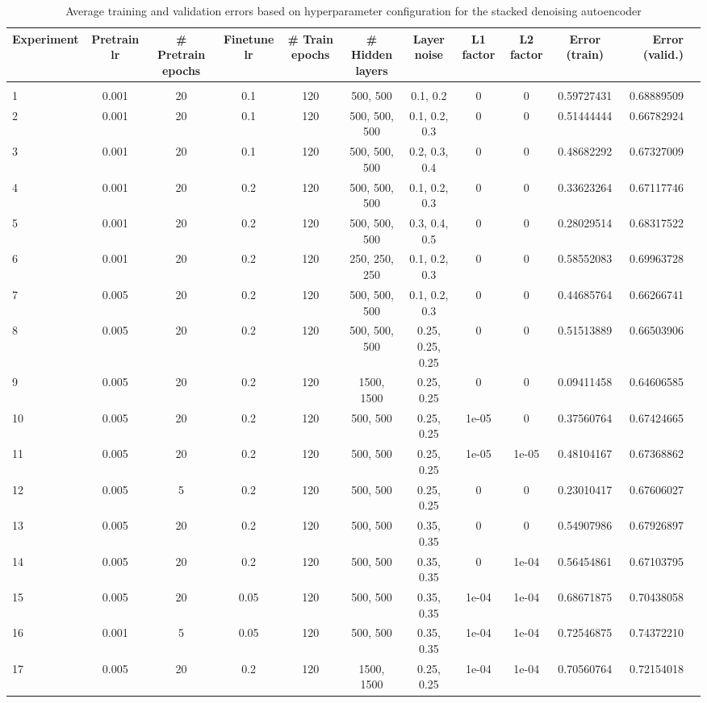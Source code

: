 \documentclass{acm_proc_article-sp}
\begin{document}
\appendix
\label{appendix}
\begin{table}
\caption{Average training and validation errors based on hyperparameter configuration for the stacked denoising autoencoder}
\label{tab:sda_params}
\begin{center}
\begin{adjustbox}{width=\textwidth}
\begin{tabular}{lccccccccc|rr|}

{\bf Experiment} & {\bf Pretrain lr} & {\bf \# Pretrain epochs}
&{\bf Finetune lr}
&{\bf \# Train epochs}
&{\bf \# Hidden layers}
&{\bf Layer noise}
&{\bf L1 factor}
&{\bf L2 factor}
&{\bf Error (train)}
&{\bf Error (valid.)}
\\ \hline \\	
1 & 0.001 & 20 & 0.1 & 120 & 500, 500 & 0.1, 0.2 & 0 & 0 & 0.59727431 & 0.68889509 \\
2 & 0.001 & 20 & 0.1 & 120 & 500, 500, 500 & 0.1, 0.2, 0.3 & 0 & 0 & 0.51444444 & 0.66782924 \\
3 & 0.001 & 20 & 0.1 & 120 & 500, 500, 500 & 0.2, 0.3, 0.4 & 0 & 0 & 0.48682292 & 0.67327009 \\
4& 0.001 & 20 & 0.2 & 120 & 500, 500, 500 & 0.1, 0.2, 0.3 & 0 & 0 & 0.33623264 & 0.67117746 \\
5 & 0.001 & 20 & 0.2 & 120 & 500, 500, 500 & 0.3, 0.4, 0.5 & 0 & 0 & 0.28029514 & 0.68317522 \\
6 & 0.001 & 20 & 0.2 & 120 & 250, 250, 250 & 0.1, 0.2, 0.3 & 0 & 0 & 0.58552083 & 0.69963728 \\
7 & 0.005 & 20 & 0.2 & 120 & 500, 500, 500 & 0.1, 0.2, 0.3 & 0 & 0 & 0.44685764 & 0.66266741 \\
8 & 0.005 & 20 & 0.2 & 120 & 500, 500, 500 & 0.25, 0.25, 0.25 & 0 & 0 & 0.51513889 & 0.66503906 \\
9 & 0.005 & 20 & 0.2 & 120 & 1500, 1500 & 0.25, 0.25 & 0 & 0 & 0.09411458 & 0.64606585 \\
10 & 0.005 & 20 & 0.2 & 120 & 500, 500 & 0.25, 0.25 & 1e-05 & 0 & 0.37560764 & 0.67424665 \\
11 & 0.005 & 20 & 0.2 & 120 & 500, 500 & 0.25, 0.25 & 1e-05 & 1e-05 & 0.48104167 & 0.67368862 \\
12 & 0.005 & 5 & 0.2 & 120 & 500, 500 & 0.25, 0.25 & 0 & 0 & 0.23010417 & 0.67606027 \\
13 & 0.005 & 20 & 0.2 & 120 & 500, 500 & 0.35, 0.35 & 0 & 0 & 0.54907986 & 0.67926897 \\
14 & 0.005 & 20 & 0.2 & 120 & 500, 500 & 0.35, 0.35 & 0 & 1e-04 & 0.56454861 & 0.67103795 \\
15 & 0.005 & 20 & 0.05 & 120 & 500, 500 & 0.35, 0.35 & 1e-04 & 1e-04 & 0.68671875 & 0.70438058 \\
16 & 0.001 & 5 & 0.05 & 120 & 500, 500 & 0.35, 0.35 & 1e-04 & 1e-04 & 0.72546875 & 0.74372210 \\
17 & 0.005 & 20 & 0.2 & 120 & 1500, 1500 & 0.25, 0.25 & 1e-04 & 1e-04 & 0.70560764 & 0.72154018 \\ 

\end{tabular}
\end{adjustbox}
\end{center}
\end{table}
\end{document}
